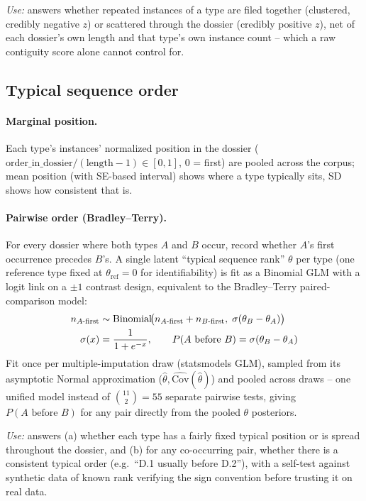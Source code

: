 \textit{Use:} answers whether repeated instances of a type are filed
together (clustered, credibly negative $z$) or scattered through the dossier
(credibly positive $z$), net of each dossier's own length and that type's
own instance count -- which a raw contiguity score alone cannot control for.

\subsection{Typical sequence order}
\label{sec:order}

\paragraph{Marginal position.} Each type's instances' normalized position
in the dossier ($\text{order\_in\_dossier} / (\text{length}-1) \in [0,1]$,
0 = first) are pooled across the corpus; mean position (with SE-based
interval) shows where a type typically sits, SD shows how consistent that
is.

\paragraph{Pairwise order (Bradley--Terry).} For every dossier where both
types $A$ and $B$ occur, record whether $A$'s first occurrence precedes
$B$'s. A single latent ``typical sequence rank'' $\theta$ per type (one
reference type fixed at $\theta_{\text{ref}}=0$ for identifiability) is fit
as a Binomial GLM with a logit link on a $\pm1$ contrast design, equivalent
to the Bradley--Terry paired-comparison model:
\begin{align}
  n_{A\text{-first}} &\sim \mathrm{Binomial}\!\bigl(n_{A\text{-first}} + n_{B\text{-first}},\; \sigma(\theta_B - \theta_A)\bigr) \\
  \sigma(x) &= \frac{1}{1+e^{-x}}, \qquad
  P(A \text{ before } B) = \sigma(\theta_B - \theta_A)
\end{align}
Fit once per multiple-imputation draw (statsmodels GLM), sampled from its
asymptotic Normal approximation ($\hat\theta, \widehat{\mathrm{Cov}}(\hat\theta)$)
and pooled across draws -- one unified model instead of $\binom{11}{2}=55$
separate pairwise tests, giving $P(A\text{ before }B)$ for any pair directly
from the pooled $\theta$ posteriors.

\textit{Use:} answers (a) whether each type has a fairly fixed typical
position or is spread throughout the dossier, and (b) for any co-occurring
pair, whether there is a consistent typical order (e.g.\ ``D.1 usually before
D.2''), with a self-test against synthetic data of known rank verifying the
sign convention before trusting it on real data.


